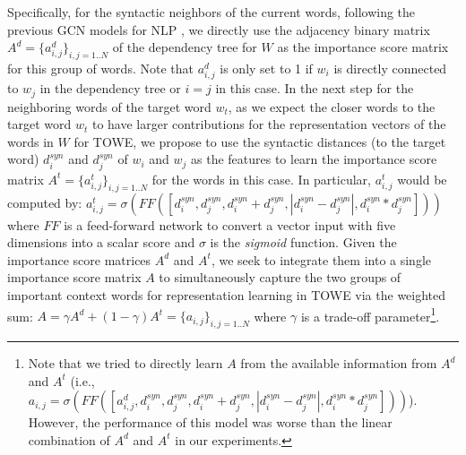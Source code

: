 \documentclass[11pt,a4paper]{article}
\begin{document}
Specifically, for the syntactic neighbors of the current words, following the previous GCN models for NLP \citep{Marcheggiani:17,Nguyen:18,Veyseh:19b}, we directly use the adjacency binary matrix $A^d = \{a^d_{i,j}\}_{i,j=1..N}$ of the dependency tree for $W$ as the importance score matrix for this group of words. Note that $a^d_{i,j}$ is only set to 1 if $w_i$ is directly connected to $w_j$ in the dependency tree or $i=j$ in this case. In the next step for the neighboring words of the target word $w_t$, as we expect the closer words to the target word $w_t$ to have larger contributions for the representation vectors of the words in $W$ for TOWE, we propose to use the syntactic distances (to the target word) $d^{syn}_i$ and $d^{syn}_j$ of $w_i$ and $w_j$ as the features to learn the importance score matrix $A^t = \{a^t_{i,j}\}_{i,j=1..N}$ for the words in this case. In particular, $a^t_{i,j}$ would be computed by: $a^t_{i,j} = \sigma(FF([d^{syn}_i, d^{syn}_j, d^{syn}_i + d^{syn}_j, |d^{syn}_i - d^{syn}_j|, d^{syn}_i * d^{syn}_j]))$ where $FF$ is a feed-forward network to convert a vector input with five dimensions into a scalar score and $\sigma$ is the {\it sigmoid} function. Given the importance score matrices $A^d$ and $A^t$, we seek to integrate them into a single importance score matrix $A$ to simultaneously capture the two groups of important context words for representation learning in TOWE via the weighted sum: $A = \gamma A^d + (1-\gamma) A^t = \{a_{i,j}\}_{i,j=1..N}$ where $\gamma$ is a trade-off parameter\footnote{Note that we tried to directly learn $A$ from the available information from $A^d$ and $A^t$ (i.e., $a_{i,j} = \sigma(FF([a^d_{i,j}, d^{syn}_i, d^{syn}_j, d^{syn}_i + d^{syn}_j, |d^{syn}_i - d^{syn}_j|, d^{syn}_i * d^{syn}_j]))$). However, the performance of this model was worse than the linear combination of $A^d$ and $A^t$ in our experiments.}.
\end{document}
